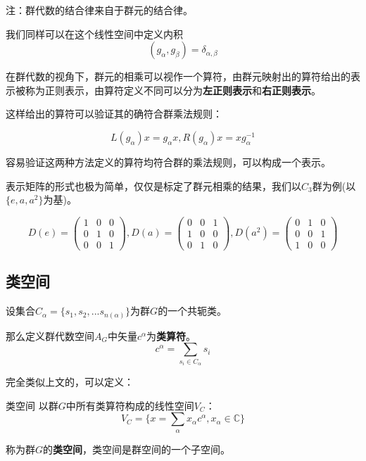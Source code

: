 注：群代数的结合律来自于群元的结合律。

我们同样可以在这个线性空间中定义内积
$$(g_\alpha,g_\beta)=\delta_{\alpha,\beta}$$

在群代数的视角下，群元的相乘可以视作一个算符，由群元映射出的算符给出的表示被称为正则表示，由算符定义不同可以分为\textbf{左正则表示}和\textbf{右正则表示}。

这样给出的算符可以验证其的确符合群乘法规则：

$$L(g_\alpha)x=g_\alpha x,R(g_\alpha)x=xg_\alpha^{-1}$$

容易验证这两种方法定义的算符均符合群的乘法规则，可以构成一个表示。

表示矩阵的形式也极为简单，仅仅是标定了群元相乘的结果，我们以$C_3$群为例(以$\{e,a,a^2\}$为基)。

$$D(e)=\begin{pmatrix}
 1& 0& 0\\
 0 &1 & 0 \\
 0&0&1
 \end{pmatrix},
 D(a)=\begin{pmatrix}
 0&0& 1\\
 1&0 & 0 \\
 0&1&0
 \end{pmatrix},
 D(a^2)=\begin{pmatrix}
 0& 1& 0\\
 0 &0 & 1 \\
 1&0&0
\end{pmatrix}$$

\subsection{类空间}

\begin{definition}{}
设集合$C_\alpha=\{s_1,s_2,...s_{n(\alpha)}\}$为群$G$的一个共轭类。

那么定义群代数空间$A_G$中矢量$c^\alpha$为\textbf{类算符}。
$$c^\alpha=\displaystyle\sum_{s_i\in C_\alpha}s_i$$
\end{definition}

完全类似上文的，可以定义：
\begin{definition}{类空间}
以群$G$中所有类算符构成的线性空间$V_C$：
$$V_C=\{x=\displaystyle\sum_\alpha x_\alpha c^\alpha,x_\alpha \in \mathbb{C}\}$$

称为群$G$的\textbf{类空间}，类空间是群空间的一个子空间。
\end{definition}